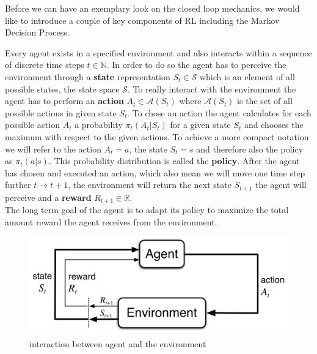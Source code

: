 Before we can have an exemplary look on the closed loop mechanics, we would like to introduce a couple of key components of RL including the Markov Decision Process.

Every agent exists in a specified environment and also interacts within a sequence of discrete time steps $t \in \mathbb{N}$. In order to do so the agent has to perceive the environment through a \textbf{state} representation $S_t \in \mathcal{S}$ which is an element of all possible states, the state space $\mathcal{S}$. To really interact with the environment the agent has to perform an \textbf{action} $A_t \in \mathcal{A}(S_t)$ where $\mathcal{A}(S_t)$ is the set of all possible actions in given state $S_t$. To chose an action the agent calculates for each possible action $A_t$ a probability $\pi_t(A_t|S_t)$ for a given state $S_t$ and chooses the maximum with respect to the given actions. To achieve a more compact notation we will refer to the action $A_t = a$, the state $S_t = s$ and therefore also the policy as $\pi_t(a|s)$.  
This probability distribution is called the \textbf{policy}. 
After the agent has chosen and executed an action, which also mean we will move one time step further $t \to t + 1$, the environment will return the next state $S_{t+1}$ the agent will perceive and a \textbf{reward} $R_{t+1} \in \mathbb{R}$.\\
The long term goal of the agent is to adapt its policy to maximize the total amount reward the agent receives from the environment.

\begin{figure}[htb!]
	\centering
    \includegraphics[width=\linewidth,]{figures/background/agent-environment-interaction.png}
	\caption{interaction between agent and the environment}
	\label{fig:agent-environment_interaction}
	\endminipage
\end{figure}



